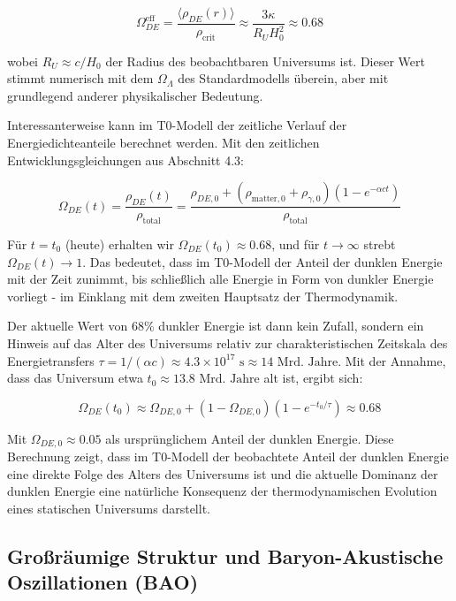 \documentclass[a4paper,12pt]{article}
\theoremstyle{definition}
\theoremstyle{remark}
\begin{document}
	\begin{equation}
		\Omega_{DE}^{\text{eff}} = \frac{\langle\rho_{DE}(r)\rangle}{\rho_{\text{crit}}} \approx \frac{3\kappa}{R_U H_0^2} \approx 0.68
	\end{equation}
	
	wobei $R_U \approx c/H_0$ der Radius des beobachtbaren Universums ist. Dieser Wert stimmt numerisch mit dem $\Omega_{\Lambda}$ des Standardmodells überein, aber mit grundlegend anderer physikalischer Bedeutung.
	
	Interessanterweise kann im T0-Modell der zeitliche Verlauf der Energiedichteanteile berechnet werden. Mit den zeitlichen Entwicklungsgleichungen aus Abschnitt 4.3:
	
	\begin{equation}
		\Omega_{DE}(t) = \frac{\rho_{DE}(t)}{\rho_{\text{total}}} = \frac{\rho_{DE,0} + (\rho_{\text{matter},0} + \rho_{\gamma,0})(1 - e^{-\alpha c t})}{\rho_{\text{total}}}
	\end{equation}
	
	Für $t=t_0$ (heute) erhalten wir $\Omega_{DE}(t_0) \approx 0.68$, und für $t \rightarrow \infty$ strebt $\Omega_{DE}(t) \rightarrow 1$. Das bedeutet, dass im T0-Modell der Anteil der dunklen Energie mit der Zeit zunimmt, bis schließlich alle Energie in Form von dunkler Energie vorliegt - im Einklang mit dem zweiten Hauptsatz der Thermodynamik.
	
	Der aktuelle Wert von 68\% dunkler Energie ist dann kein Zufall, sondern ein Hinweis auf das Alter des Universums relativ zur charakteristischen Zeitskala des Energietransfers $\tau = 1/(\alpha c) \approx 4.3 \times 10^{17} \text{ s} \approx 14 \text{ Mrd. Jahre}$. Mit der Annahme, dass das Universum etwa $t_0 \approx 13.8 \text{ Mrd. Jahre}$ alt ist, ergibt sich:
	
	\begin{equation}
		\Omega_{DE}(t_0) \approx \Omega_{DE,0} + (1 - \Omega_{DE,0})(1 - e^{-t_0/\tau}) \approx 0.68
	\end{equation}
	
	Mit $\Omega_{DE,0} \approx 0.05$ als ursprünglichem Anteil der dunklen Energie. Diese Berechnung zeigt, dass im T0-Modell der beobachtete Anteil der dunklen Energie eine direkte Folge des Alters des Universums ist und die aktuelle Dominanz der dunklen Energie eine natürliche Konsequenz der thermodynamischen Evolution eines statischen Universums darstellt.
	
	\subsection{Großräumige Struktur und Baryon-Akustische Oszillationen (BAO)}
	
\end{document}
